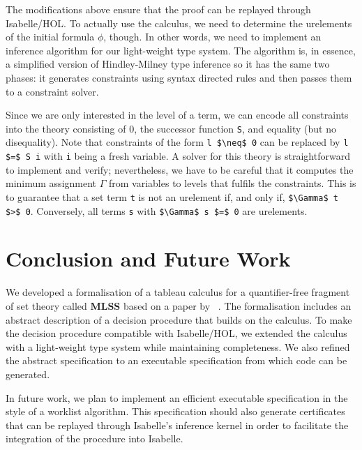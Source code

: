 \documentclass[runningheads]{llncs}
\newcommand{\MLSS}{\textbf{MLSS}}
\begin{document}
The modifications above ensure that the proof can be replayed through Isabelle/HOL.
To actually use the calculus, we need to determine the urelements of the initial formula $\phi$, though.
In other words, we need to implement an inference algorithm for our light-weight type system.
The algorithm is, in essence, a simplified version of Hindley-Milney type inference so it has the same two phases:
it generates constraints using syntax directed rules and then passes them to a constraint solver.

Since we are only interested in the level of a term, we can encode all constraints into the theory consisting of $0$, the successor function \lstinline!S!, and equality (but no disequality).
Note that constraints of the form \lstinline!l $\neq$ 0! can be replaced by \lstinline!l $=$ S i! with \lstinline!i! being a fresh variable.
A solver for this theory is straightforward to implement and verify;
nevertheless, we have to be careful that it computes the minimum assignment $\Gamma$ from variables to levels that fulfils the constraints. 
This is to guarantee that a set term \lstinline!t! is not an urelement if, and only if, \lstinline!$\Gamma$ t $>$ 0!.
Conversely, all terms \lstinline!s! with \lstinline!$\Gamma$ s $=$ 0! are urelements.

\section{Conclusion and Future Work}
We developed a formalisation of a tableau calculus for a quantifier-free fragment of set theory called \MLSS{} based on a paper by \citeauthor{new_fast_tableau}~\cite{new_fast_tableau}. 
The formalisation includes an abstract description of a decision procedure that builds on the calculus.
To make the decision procedure compatible with Isabelle/HOL, we extended the calculus with a light-weight type system while maintaining completeness.
We also refined the abstract specification to an executable specification from which code can be generated.

In future work, we plan to implement an efficient executable specification in the style of a worklist algorithm. 
This specification should also generate certificates that can be replayed through Isabelle's inference kernel in order to facilitate the integration of the procedure into Isabelle.

\end{document}
